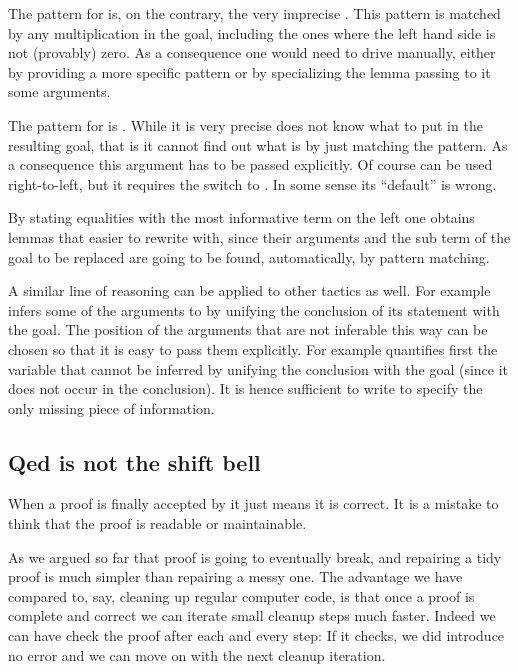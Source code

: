 The pattern for
 is, on the contrary, the very imprecise \C{(\_ * \_)}.
This pattern is matched by any multiplication in the goal, including
the ones where the left hand side is not (provably) zero. As a consequence
one would need to drive  manually, either by providing
a more specific pattern or by specializing the lemma passing to it
some arguments.

The pattern for  is . While it is very precise
 does not know what to put in the resulting goal, that is
it cannot find out what  is by just matching the pattern.
As a consequence this argument has to be passed explicitly.
Of course  can be used right-to-left, but it requires the
\C{$~$-}
switch to . In some sense its ``default'' is wrong.

By stating equalities with the most informative term on the left one
obtains lemmas that easier to rewrite with, since their
arguments and the sub term of the goal to be replaced are going to be
found, automatically, by pattern matching.

A similar line of reasoning can be applied to other tactics as well. For
example  infers some of the arguments to  by unifying the
conclusion of its statement with the goal. The position of the arguments that
are not inferable this way can be chosen so that it is easy to pass them
explicitly.  For example  quantifies first the variable that cannot be inferred by unifying the
conclusion with the goal (since it does not occur in the conclusion).
It is hence sufficient to write  to specify the only
missing piece of information.

\subsection{Qed is not the shift bell}

When a proof is finally accepted by \Coq{} it just means it is correct.
It is a mistake to think that the proof is readable or maintainable.

As we argued so far that proof is going to eventually break, and repairing a
tidy proof is much simpler than repairing a messy one.  
The advantage we have compared to, say, cleaning up regular computer code, is
that once a proof is complete and correct we can iterate small cleanup steps
much faster. Indeed we can have \Coq{} check the proof after each and every
step: If it checks, we did introduce no error and we can move on with the next
cleanup iteration.

